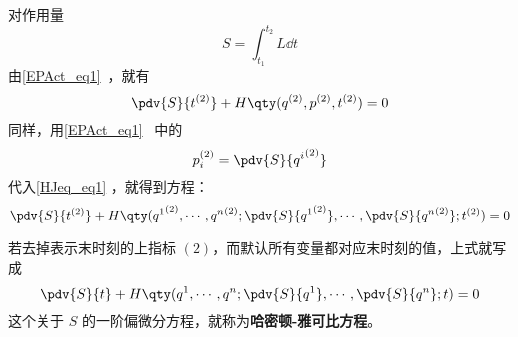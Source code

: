 
对作用量
\begin{equation}
S=\int_{t_1}^{t_2}L\dd t
\end{equation}
由\autoref{EPAct_eq1}~，就有
\begin{equation}\label{HJeq_eq1}
\pdv{S}{t^{(2)}}+H\qty(q^{(2)},p^{(2)},t^{(2)})=0
\end{equation}
同样，用\autoref{EPAct_eq1}~ 中的
\begin{equation}
p_i^{(2)}=\pdv{S}{{q^i}^{(2)}}
\end{equation}
代入\autoref{HJeq_eq1} ，就得到方程：
\begin{equation}
\pdv{S}{t^{(2)}}+H\qty({q^1}^{(2)},\cdots,{q^n}^{(2)};\pdv{S}{{q^1}^{(2)}},\cdots,\pdv{S}{{q^n}^{(2)}};t^{(2)})=0
\end{equation}

若去掉表示末时刻的上指标 $(2)$，而默认所有变量都对应末时刻的值，上式就写成
\begin{equation}
\pdv{S}{t}+H\qty({q^1},\cdots,{q^n};\pdv{S}{{q^1}},\cdots,\pdv{S}{{q^n}};t)=0
\end{equation}
这个关于 $S$ 的一阶偏微分方程，就称为\textbf{哈密顿-雅可比方程}。